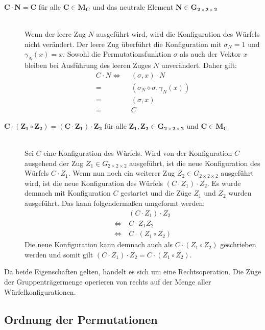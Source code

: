 \documentclass[12pt,a4paper, usenames, dvipsnames]{article}
\theoremstyle{mystyle}
\theoremstyle{definition}
\newcommand{\Gtwo}{\ensuremath{G_{2\times 2\times 2}}}
\begin{document}
\begin{description}
\item [$\boldsymbol{C \cdot N = C}$ für alle $\boldsymbol{C \in M_C}$ und das neutrale Element $\boldsymbol{N \in \Gtwo}$] 
\ \\
Wenn der leere Zug $N$ ausgeführt wird, wird die Konfiguration des Würfels nicht verändert. Der leere Zug überführt die Konfiguration mit $\sigma_N=1$ und $\gamma_N(x)=x$. Sowohl die Permutationsfunktion $\sigma$ als auch der Vektor $x$ bleiben bei Ausführung des leeren Zuges $N$ unverändert. Daher gilt:
\begin{align*}
 C \cdot N 
\Leftrightarrow \ \ & (\sigma, x) \cdot  N \\
= \ \ & (\sigma_N \diamond \sigma, \gamma_N(x)) \\
= \ \ & (\sigma, x) \\
= \ \ & C
\end{align*}

\item [$\boldsymbol{C \cdot (Z_1 \circ Z_2) = (C \cdot Z_1) \cdot Z_2}$ für alle $\boldsymbol{Z_1, Z_2 \in \Gtwo}$ und $\boldsymbol{C \in M_C}$]
\ \\
Sei $C$ eine Konfiguration des Würfels. Wird von der Konfiguration $C$ ausgehend der Zug $Z_1 \in \Gtwo$ ausgeführt, ist die neue Konfiguration des Würfels $C \cdot Z_1$. Wenn nun noch ein weiterer Zug $Z_2 \in \Gtwo$ ausgeführt wird, ist die neue Konfiguration des Würfels $(C \cdot Z_1) \cdot Z_2$. 
Es wurde demnach mit Konfiguration $C$ gestartet und die Züge $Z_1$ und $Z_2$ wurden ausgeführt. Das kann folgendermaßen umgeformt werden:
\begin{align*}
& (C \cdot Z_1) \cdot Z_2 \\
\Leftrightarrow \ & C \cdot Z_1Z_2 \\
\Leftrightarrow \ & C \cdot (Z_1 \circ Z_2)
\end{align*}
Die neue Konfiguration kann demnach auch als $C \cdot (Z_1 \circ Z_2)$ geschrieben werden und somit gilt $(C \cdot Z_1) \cdot Z_2 = C \cdot (Z_1 \circ Z_2)$. 
\end{description}

Da beide Eigenschaften gelten, handelt es sich um eine Rechtsoperation. Die Züge der Gruppenträgermenge operieren von rechts auf der Menge aller Würfelkonfigurationen.

%
%
%
%
%
%
%
%
%
%
%
%

\subsection{Ordnung der Permutationen}
 \label{Abschnitt_OrdnungPermutationen}
\end{document}
